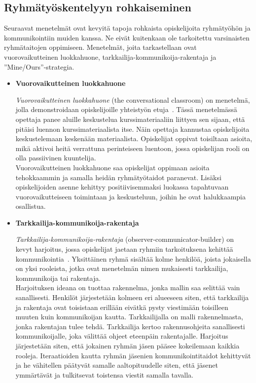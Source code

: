 \documentclass[finnish]{../tktltiki2}
\theoremstyle{definition}
\theoremstyle{remark}
\begin{document}
\subsection{Ryhmätyöskentelyyn rohkaiseminen}

Seuraavat menetelmät ovat kevyitä tapoja rohkaista opiskelijoita
ryhmätyö\-hön ja kommunikointiin muiden kanssa. Ne eivät kuitenkaan
ole tarkoitettu varsinaisten ryhmätaitojen oppimiseen. Menetelmät, joita tarkastellaan
ovat vuorovaikutteinen luokkahuone, tarkkailija-kommunikoija-rakentaja ja ''Mine/Ours''-strategia.


\begin{itemize}

\item {\bf Vuorovaikutteinen luokkahuone}

\emph{Vuorovaikutteinen luokkahuone} (the conversational classroom) on menetelmä, jolla demonstroidaan opiskelijoille yhteistyön etuja~\cite{Waite:2004:SCV:1028174.971308}. Tässä menetelmässä opettaja panee aluille keskustelua kurssimateriaaliin liittyen sen sijaan, että pitäisi luennon kurssimateriaalista itse. Näin opettaja kannustaa opiskelijoita keskustelemaan keskenään materiaalista. Opiskelijat oppivat toisiltaan asioita, mikä
aktivoi heitä verrattuna perinteiseen luentoon, jossa opiskelijan
rooli on olla passiivinen kuuntelija.\\

Vuorovaikutteinen luokkahuone saa opiskelijat oppimaan asioita tehokkaammin ja samalla heidän ryhmätyötaidot paranevat.
Lisäksi opiskelijoiden asenne kehittyy positiivisemmaksi luokassa tapahtuvaan vuorovaikutteiseen toimintaan ja keskusteluun, joihin he ovat halukkaampia osallistua.

\item {\bf Tarkkailija-kommunikoija-rakentaja}

\emph{Tarkkailija-kommunikoija-rakentaja} (observer-communicator-builder) on kevyt harjoitus, jossa
opiskelijat jaetaan ryhmiin tarkoituksena kehittää
kommunikointia~\cite{Cushing:2003:TBP:948785.948797}. Yksittäinen
ryhmä sisältää kolme henkilöä, joista jokaisella on yksi
rooleista, jotka ovat menetelmän nimen mukaisesti tarkkailija, kommunikoija tai rakentaja.\\

Harjoituksen ideana on tuottaa rakennelma, jonka mallin saa selittää vain sanallisesti. Henkilöt järjestetään
kolmeen eri alueeseen siten, että tarkkailija ja rakentaja ovat
toisistaan erillään eivätkä pysty viestimään toisilleen muuten
kuin kommunikoijan kautta. Tarkkailijalla on malli rakennelmasta,
jonka rakentajan tulee tehdä. Tarkkailija kertoo rakennusohjeita
sanallisesti kommunikoijalle, joka välittää ohjeet eteenpäin rakentajalle. Harjoitus järjestetään siten, että jokainen ryhmän
jäsen pääsee kokeilemaan kaikkia rooleja. Iteraatioiden kautta
ryhmän jäsenien kommunikointitaidot kehittyvät ja he vähitellen päätyvät samalle aaltopituudelle siten, että jäsenet ymmärtävät ja tulkitsevat toistensa viestit samalla tavalla.


\end{itemize}
\end{document}
